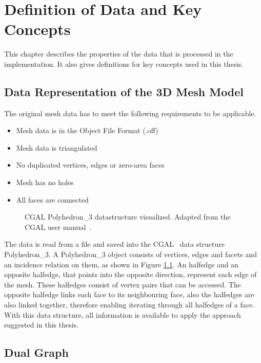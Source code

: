 \documentclass[draft,final]{vutinfth} %
\begin{document}
\chapter{Definition of Data and Key Concepts}
\label{chap:definitions}
This chapter describes the properties of the data that is processed in the implementation. It also gives definitions for key concepts used in this thesis.

\section{Data Representation of the 3D Mesh Model}
The original mesh data has to meet the following requirements to be applicable.

\begin{itemize}
	\item Mesh data is in the Object File Format (.off)
	\item Mesh data is triangulated
	\item No duplicated vertices, edges or zero-area faces
	\item Mesh has no holes
	\item All faces are connected
\end{itemize}

\begin{figure}

\caption{CGAL Polyhedron\_3 datastructure visualized. Adapted from the CGAL user manual~\cite{cgal:eb-19a}.}
\label{fig:cgal}
\end{figure}

The data is read from a file and saved into the CGAL~\cite{cgal:eb-19a} data structure Polyhedron\_3. A Polyhedron\_3 object consists of vertices, edges and facets and an incidence relation on them, as shown in Figure \ref{fig:cgal}. An halfedge and an opposite halfedge, that points into the opposite direction, represent each edge of the mesh. These halfedges consist of vertex pairs that can be accessed. The opposite halfedge links each face to its neighbouring face, also the halfedges are also linked together, therefore enabling iterating through all halfedges of a face. With this data structure, all information is available to apply the approach suggested in this thesis.

\section{Dual Graph}
\end{document}
